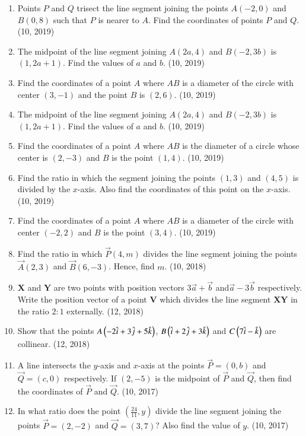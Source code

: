 \begin{enumerate}[label=\thesubsection.\arabic*,ref=\thesubsection.\theenumi]
\item Points $P$ and $Q$ trisect the line segment joining the points $A(-2, 0)$ and $B(0, 8)$ such that $P$ is nearer to $A$. Find the coordinates of points $P$ and $Q$. \hfill (10, 2019)
\item The midpoint of the line segment joining $A(2a, 4)$ and $B(-2, 3b)$ is $(1, 2a + 1)$. Find the values of $a$ and $b$. \hfill (10, 2019)
\item Find the coordinates of a point $A$ where $AB$ is a diameter of the circle with center $(3, -1)$ and the point $B$ is $(2, 6)$. \hfill (10, 2019)
\item The midpoint of the line segment joining $A(2a, 4)$ and $B(-2, 3b)$ is $(1, 2a + 1)$. Find the values of $a$ and $b$. \hfill (10, 2019)
\item Find the coordinates of a point $A$ where $AB$ is the diameter of a circle whose center is $(2, -3)$ and $B$ is the point $(1, 4)$. \hfill (10, 2019)
\item Find the ratio in which the segment joining the points $(1, 3)$ and $(4, 5)$ is divided by the $x$-axis. Also find the coordinates of this point on the $x$-axis. \hfill (10, 2019)
\item Find the coordinates of a point $A$ where $AB$ is a diameter of the circle with center $(-2, 2)$ and $B$ is the point $(3, 4)$. \hfill (10, 2019)
    \item Find the ratio in which $\vec{P}(4,m)$ divides the line segment joining the points $\vec{A}(2,3)$ and $\vec{B}(6,-3)$. Hence, find $m$. \hfill (10, 2018)
\item $\mathbf{X}$ and $\mathbf{Y}$ are two points with position vectors $3\overrightarrow{a}+\overrightarrow{b}$ and$\overrightarrow{a}-3\overrightarrow{b}$ respectively. Write the position vector of a point $\mathbf{V}$ which divides the line segment $\mathbf{XY}$ in the ratio $2:1$ externally.
\hfill (12, 2018) 
\item Show that the points $A\left(-2\hat{i} + 3\hat{j} + 5\hat{k}\right)$, $B\left(\hat{i} + 2\hat{j} + 3\hat{k}\right)$ and $C\left(7\hat{i} -\hat{k} \right)$ are collinear.
\hfill (12, 2018) 
\item A line intersects the $y$-axis and $x$-axis at the points $\vec{P} = (0, b)$ and $\vec{Q} = (c, 0)$ respectively. If $(2, -5)$ is the midpoint of $\vec{P}$ and $\vec{Q}$, then find the coordinates of $\vec{P}$ and $\vec{Q}$. \hfill (10, 2017)
\item In what ratio does the point $\left(\frac{24}{11}, y\right)$ divide the line segment joining the points $\vec{P} = (2, -2)$ and $\vec{Q} = (3, 7)$? Also find the value of $y$. \hfill (10, 2017)
\end{enumerate}
